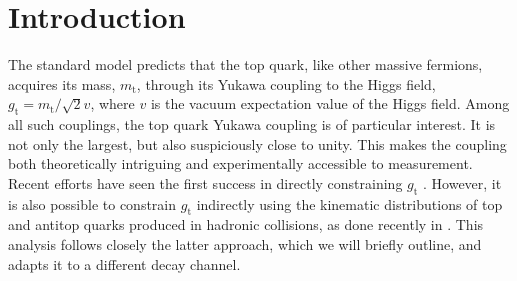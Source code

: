\section{Introduction}
\label{S:intro}

The standard model predicts that the top quark, like other massive fermions,  acquires its mass, $m_\mathrm{t}$, through its Yukawa coupling to the Higgs field, $g_\mathrm{t}=m_\mathrm{t}/\sqrt{2}v$, where $v$ is the vacuum expectation value of the Higgs field. Among all such couplings, the top quark Yukawa coupling  is of particular interest. It is not only the largest, but also suspiciously close to unity. This makes the coupling both theoretically intriguing and experimentally accessible to measurement. Recent efforts have seen the first success in directly constraining $g_\mathrm{t}$ \cite{ttH}. However, it is also possible to constrain $g_\mathrm{t}$ indirectly using the kinematic distributions of top and antitop quarks produced in hadronic collisions, as done recently in \cite{ytpaper}. This analysis follows closely the latter approach, which we will briefly outline, and adapts it to a different \ttbar decay channel.

